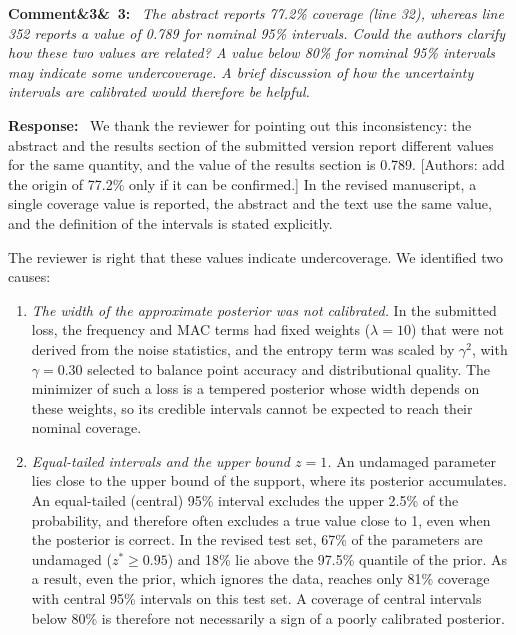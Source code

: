 \documentclass[11pt]{article}
\newenvironment{rcomment}[1]{\par\bigskip\noindent\textbf{Comment\ifx&#1&\else\ #1\fi:}\ \itshape}{\par}
\newenvironment{response}{\par\smallskip\noindent\color{resp}\textbf{Response:}\ }{\par}
\newcommand{\authornote}[1]{\textcolor{note}{\textsf{[Authors: #1]}}}
\begin{document}
\begin{rcomment}{3}
The abstract reports 77.2\% coverage (line 32), whereas line 352 reports a value of 0.789 for nominal 95\% intervals.
Could the authors clarify how these two values are related? A value below 80\% for nominal 95\% intervals may indicate
some undercoverage. A brief discussion of how the uncertainty intervals are calibrated would therefore be helpful.
\end{rcomment}

\begin{response}
We thank the reviewer for pointing out this inconsistency: the abstract and the results section of the submitted version
report different values for the same quantity, and the value of the results section is 0.789.
\authornote{add the origin of 77.2\% only if it can be confirmed.} In the revised manuscript, a single coverage value is
reported, the abstract and the text use the same value, and the definition of the intervals is stated explicitly.

The reviewer is right that these values indicate undercoverage. We identified two causes:
\begin{enumerate}[leftmargin=*]
\item \emph{The width of the approximate posterior was not calibrated.} In the submitted loss, the frequency and MAC
terms had fixed weights ($\lambda=10$) that were not derived from the noise statistics, and the entropy term was
scaled by $\gamma^2$, with $\gamma=0.30$ selected to balance point accuracy and distributional quality. The minimizer of such a loss is a tempered posterior
whose width depends on these weights, so its credible intervals cannot be expected to reach their nominal coverage.
\item \emph{Equal-tailed intervals and the upper bound $z=1$.} An undamaged parameter lies close to the upper bound of
the support, where its posterior accumulates. An equal-tailed (central) 95\% interval excludes the upper 2.5\% of the
probability, and therefore often excludes a true value close to 1, even when the posterior is correct. In the revised
test set, 67\% of the parameters are undamaged ($z^*\ge0.95$) and 18\% lie above the 97.5\% quantile of the prior. As a
result, even the prior, which ignores the data, reaches only 81\% coverage with central 95\% intervals on this test set.
A coverage of central intervals below 80\% is therefore not necessarily a sign of a poorly calibrated posterior.
\end{enumerate}


\end{response}
\end{document}
